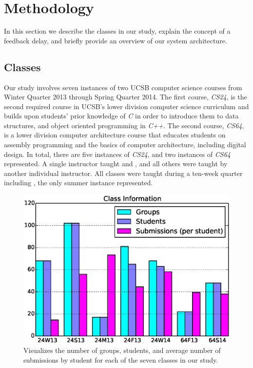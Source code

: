 \section{Methodology} 

In this section we describe the classes in our study, explain the concept of a
feedback delay, and briefly provide an overview of our system architecture.

\subsection{Classes}

Our study involves seven instances of two UCSB computer science courses from
Winter Quarter 2013 through Spring Quarter 2014. The first course, \emph{CS24},
is the second required course in UCSB's lower division computer science
curriculum and builds upon students' prior knowledge of \emph{C} in order to
introduce them to data structures, and object oriented programming in
\emph{C++}. The second course, \emph{CS64}, is a lower division computer
architecture course that educates students on assembly programming and the
basics of computer architecture, including digital design. In total, there are
five instances of \emph{CS24}, and two instances of \emph{CS64} represented. A
single instructor taught  and , and all others were
taught by another individual instructor. All classes were taught during a
ten-week quarter including , the only summer instance represented.

\begin{figure}[!t]
\centering \includegraphics[width=5.25in]{graphs/Class_Information.eps}
\caption{Visualizes the number of groups, students, and average number of
  submissions by student for each of the seven classes in our study.}
\end{figure}


